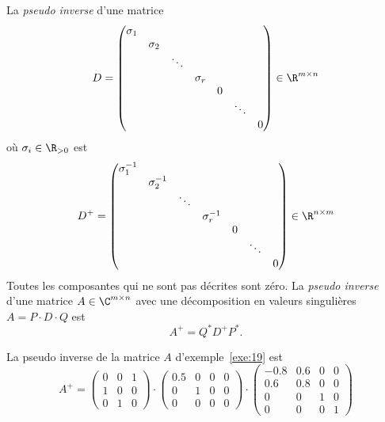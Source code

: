 \begin{definition}
  La \emph{pseudo inverse} d'une matrice 
  \begin{displaymath}
    D =
    \begin{pmatrix}
      \sigma_1 \\
      & \sigma_2 \\
      & & \ddots \\
      & & & \sigma_r \\
      & & & & 0 \\
      & & & & & \ddots  \\
      & & & & & & 0  \\      
    \end{pmatrix}
    \in \R^{m \times n}
  \end{displaymath}
où $\sigma_i \in \R_{>0}$ est 
\begin{displaymath}
  D^+ =  \begin{pmatrix}
      \sigma_1^{-1} \\
      & \sigma_2^{-1} \\
      & & \ddots \\
      & & & \sigma_r^{-1} \\
      & & & & 0 \\
      & & & & & \ddots  \\
      & & & & & & 0  \\      
    \end{pmatrix}
    \in \R^{n \times m}
\end{displaymath}
Toutes les composantes qui ne sont pas décrites sont zéro. 
La \emph{pseudo inverse} d'une matrice $A \in \C^{m \times n}$ avec une décomposition en valeurs singulières $A = P \cdot D \cdot Q$ est 
\begin{displaymath}
  A^+ = Q^* D^+ P^*. 
\end{displaymath}

\end{definition}


\begin{example}
  La pseudo inverse de la matrice $A$ d'exemple~\ref{exe:19} est 
  \begin{displaymath}
    A^+ = 
\begin{pmatrix}0 & 0 & 1\\1 & 0 & 0\\0 & 1 & 0\end{pmatrix} \cdot 
\begin{pmatrix}0.5 & 0 & 0 & 0\\0 & 1 & 0 & 0\\0 & 0 & 0 & 0\end{pmatrix}
\cdot
\begin{pmatrix}-0.8 & 0.6 & 0 & 0\\0.6 & 0.8 & 0 & 0\\0 & 0 & 1 & 0\\0 & 0 & 0 & 1\end{pmatrix} 
  \end{displaymath}
\end{example}

